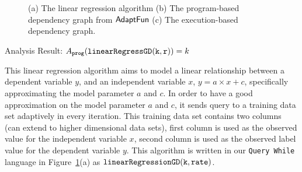 \begin{example}
\begin{figure}
\begin{subfigure}{.8\textwidth}
\begin{centering}
         \caption{}
            \end{centering}
            \end{subfigure}
    \vspace{-0.5cm}
    \caption{(a) The linear regression algorithm 
    (b) The program-based dependency graph from $\textsf{AdaptFun}$
    (c) The execution-based dependency graph.}
    \vspace{-0.5cm}
    \label{fig:linear_regression}
\end{figure}
%
Analysis Result: $ A_{\mathtt{prog}}(\mathtt{linearRegressGD(k, r)}) = k$
\end{example} 
%
 
This linear regression algorithm 
aims to
model a linear relationship between a dependent variable $y$,
and an independent variable $x$, $y = a \times x + c$, specifically approximating the 
model parameter $a$ and $c$.
In order to have a good approximation on the model parameter 
$a$ and $c$, 
it sends query to a training data set adaptively in every iteration.
This training data set contains two columns (can extend to higher dimensional data sets), first column is used as the observed value for the independent variable $x$,
second column is used as the observed label value for the dependent variable $y$.
This algorithm is written in our {\tt Query While} language in Figure~\ref{fig:linear_regression}(a) as $\mathtt{linearRegressionGD(k, rate)}$.

